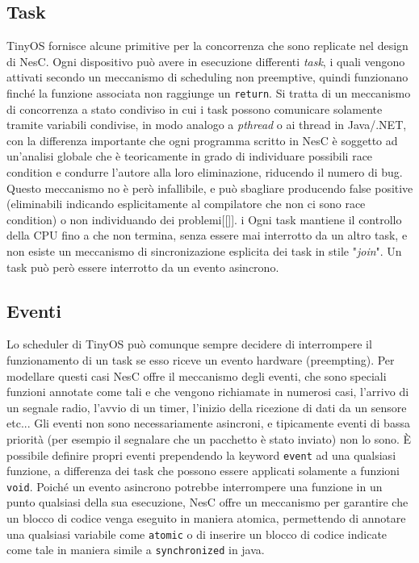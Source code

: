 \documentclass[twoside,11pt,a4paper,italian,openany]{book}
\begin{document}
\subsection{Task}
TinyOS fornisce alcune primitive per la concorrenza che sono replicate nel design di NesC.
Ogni dispositivo può avere in esecuzione differenti \emph{task}, i quali vengono attivati 
secondo un 
meccanismo di scheduling non preemptive, quindi funzionano finché la funzione associata non 
raggiunge un \texttt{return}. Si tratta di un meccanismo di concorrenza a stato condiviso in cui 
i task possono comunicare solamente tramite variabili condivise, in modo analogo a 
\emph{pthread} o ai thread in Java/.NET, con la differenza importante che ogni programma scritto in  NesC è soggetto ad 
un'analisi globale che è teoricamente in grado di individuare possibili race condition e 
condurre l'autore alla loro eliminazione, riducendo il numero di bug. 
Questo meccanismo no è però infallibile, e può sbagliare producendo false positive 
(eliminabili indicando esplicitamente al compilatore che non ci sono race condition) o non 
individuando dei problemi[[]]. i
Ogni task mantiene il controllo della CPU fino a che non termina, senza essere mai interrotto da un altro task, e non esiste un meccanismo di sincronizazione esplicita 
dei task in stile "\emph{join}".
Un task può però essere interrotto da un evento asincrono.


\subsection{Eventi}
Lo scheduler di TinyOS può comunque sempre decidere di interrompere il funzionamento di un task 
se esso riceve un evento hardware (preempting). 
Per modellare questi casi NesC offre il meccanismo degli eventi, 
che sono speciali funzioni annotate come tali e che vengono richiamate in numerosi 
casi, l'arrivo di un segnale radio, l'avvio di un timer, l'inizio della ricezione di dati da un sensore etc...
Gli eventi non sono necessariamente asincroni, e tipicamente eventi di bassa priorità (per esempio il segnalare che un pacchetto è stato inviato) non lo sono.
\`E possibile definire propri eventi prependendo la keyword \texttt{event} ad una qualsiasi 
funzione, a differenza dei task che possono essere applicati solamente a funzioni \texttt{void}.
Poiché un evento asincrono potrebbe interrompere una funzione in un punto qualsiasi della sua esecuzione, NesC offre un meccanismo per garantire che un blocco di codice venga eseguito in 
maniera atomica,  permettendo di annotare una qualsiasi variabile come \texttt{atomic} o 
di inserire un blocco di codice indicate come tale in maniera simile a \texttt{synchronized} 
in java.
\end{document}
